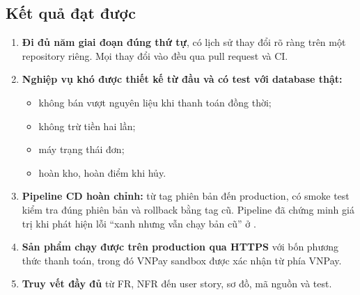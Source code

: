 \subsection{Kết quả đạt được}
\begin{enumerate}
\item \textbf{Đi đủ năm giai đoạn đúng thứ tự}, có lịch sử thay đổi rõ ràng trên một repository riêng. Mọi thay đổi vào  đều qua pull request và CI.
\item \textbf{Nghiệp vụ khó được thiết kế từ đầu và có test với database thật:}
  \begin{itemize}
  \item không bán vượt nguyên liệu khi thanh toán đồng thời;
  \item không trừ tiền hai lần;
  \item máy trạng thái đơn;
  \item hoàn kho, hoàn điểm khi hủy.
  \end{itemize}
\item \textbf{Pipeline CD hoàn chỉnh:} từ tag phiên bản đến production, có smoke test kiểm tra đúng phiên bản và rollback bằng tag cũ. Pipeline đã chứng minh giá trị khi phát hiện lỗi ``xanh nhưng vẫn chạy bản cũ'' ở .
\item \textbf{Sản phẩm chạy được trên production qua HTTPS} với bốn phương thức thanh toán, trong đó VNPay sandbox được xác nhận từ phía VNPay.
\item \textbf{Truy vết đầy đủ} từ FR, NFR đến user story, sơ đồ, mã nguồn và test.
\end{enumerate}

